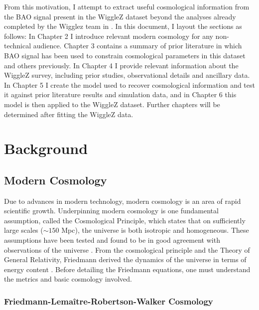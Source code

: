 \documentclass[titlesmallcaps, examinerscopy, copyrightpage]{uqthesis}
\newcommand{\green}{\color{LimeGreen}}
\begin{document}
From this motivation, I attempt to extract useful cosmological information from the BAO signal present in the WiggleZ dataset \citep[WiggleZ;][]{Drinkwater2010} beyond the analyses already completed by the Wigglez team in \citet{BlakeDavis2011, BlakeKazin2011, BlakeBroughColless2011, BlakeGlazebrook2011, Parkinson2012}. In this document, I layout the sections as follows: In Chapter 2 I introduce relevant modern cosmology for any non-technical audience. Chapter 3 contains a summary of prior literature in which BAO signal has been used to constrain cosmological parameters in this dataset and others previously. In Chapter 4 I provide relevant information about the WiggleZ survey, including prior studies, observational details and ancillary data. In Chapter 5 I create the model used to recover cosmological information and test it against prior literature results and simulation data, and in Chapter 6 this model is then applied to the WiggleZ dataset. {\green Further chapters will be determined after fitting the WiggleZ data.}







\chapter{Background}
\label{ch:back}

\section{Modern Cosmology}

Due to advances in modern technology, modern cosmology is an area of rapid scientific growth. Underpinning modern cosmology is one fundamental assumption, called the Cosmological Principle, which states that on sufficiently large scales ($\sim 150$ Mpc), the universe is both isotropic and homogeneous. These assumptions have been tested and found to be in good agreement with observations of the universe \citep{ScrimgeourDavis2012, HoggEisenstein2005, HansenBanday2004,SchwarzBacon2015,Lahav2001}. From the cosmological principle and the Theory of General Relativity, Friedmann derived the dynamics of the universe in terms of energy content \citep{RydenPeterson2010}. Before detailing the Friedmann equations, one must understand the metrics and basic cosmology involved.

\subsection{Friedmann-Lema\^itre-Robertson-Walker Cosmology} \label{sec:frw}
\end{document}
